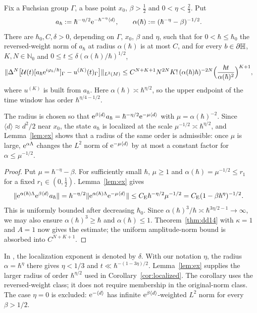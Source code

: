 \begin{corollary}\label{cor:localized}
Fix a Fuchsian group $\Gamma$, a base point $x_0$, $\beta>\tfrac12$ and $0<\eta<\tfrac23$. Put
\[
 a_\hbar:=\hbar^{-\eta/2}\mathrm{e}^{-\hbar^{-\eta}\langle d\rangle},\qquad
 \alpha(\hbar):=(\hbar^{-\eta}-\beta)^{-1/2}.
\]
There are $\hbar_0,C,\delta>0$, depending on $\Gamma$, $x_0$, $\beta$ and $\eta$, such that for $0<\hbar\le\hbar_0$ the reversed-weight
norm of $a_\hbar$ at radius $\alpha(\hbar)$ is at most $C$, and for every $b\in\partial\mathbb{H}$, $K,N\in\mathbb N_0$ and
$0\le t\le\delta(\alpha(\hbar)/\hbar)^{1/2}$,
\[
 \lVert \Delta^N\big[\mathcal{U}(t)[a_\hbar\mathrm{e}^{i\varphi_b/\hbar}]_\Gamma-u^{(K)}(t)_\Gamma\big]\rVert_{L^2(M)}
 \le C^{N+K+1}N^{2N}K!\,(\alpha(\hbar)\hbar)^{-2N}
 \Big(\frac{\hbar t}{\alpha(\hbar)^2}\Big)^{K+1},
\]
where $u^{(K)}$ is built from $a_\hbar$.
Here $\alpha(\hbar)\asymp\hbar^{\eta/2}$, so the upper endpoint of the time window has order
$\hbar^{\eta/4-1/2}$.
\end{corollary}
The radius is chosen so that $\mathrm{e}^{\beta\langle d\rangle}a_\hbar=\hbar^{-\eta/2}\mathrm{e}^{-\mu\langle d\rangle}$ with $\mu=\alpha(\hbar)^{-2}$. Since
$\langle d\rangle\approx d^2/2$ near $x_0$, the state $a_\hbar$ is localized at the scale $\mu^{-1/2}\asymp\hbar^{\eta/2}$, and Lemma~\ref{lem:ex} shows
that a radius of the same order is admissible: once $\mu$ is large, $\mathrm{e}^{\alpha\Lambda}$ changes the $L^2$ norm of $\mathrm{e}^{-\mu\langle d\rangle}$ by at most a
constant factor for $\alpha\le\mu^{-1/2}$.
\begin{proof}
Put $\mu=\hbar^{-\eta}-\beta$. For sufficiently small $\hbar$, $\mu\ge1$ and
$\alpha(\hbar)=\mu^{-1/2}\le r_1$ for a fixed $r_1\in(0,\tfrac12)$. Lemma~\ref{lem:ex} gives
\[
 \lVert \mathrm{e}^{\alpha(\hbar)\Lambda}\mathrm{e}^{\beta\langle d\rangle}a_\hbar\rVert
 =\hbar^{-\eta/2}\lVert \mathrm{e}^{\alpha(\hbar)\Lambda}\mathrm{e}^{-\mu\langle d\rangle}\rVert
 \le C_{\mathrm E}\hbar^{-\eta/2}\mu^{-1/2}
 =C_{\mathrm E}(1-\beta\hbar^\eta)^{-1/2}.
\]
This is uniformly bounded after decreasing $\hbar_0$. Since
$\alpha(\hbar)^3/\hbar\asymp\hbar^{3\eta/2-1}\to\infty$, we may also ensure
$\alpha(\hbar)^3\ge\hbar$ and $\alpha(\hbar)\le1$. Theorem~\ref{thm:dd14} with $\kappa=1$ and $A=1$ now gives the estimate;
the uniform amplitude-norm bound is absorbed into $C^{N+K+1}$.
\end{proof}

\begin{remark}
In \cite[Remark~1.7, (1.38)]{S}, the localization exponent is denoted by $\delta$.
With our notation $\eta$, the radius $\alpha=\hbar^\eta$ there gives $\eta<1/3$ and
$t\ll\hbar^{-(1-3\eta)/2}$. Lemma~\ref{lem:ex} supplies the larger radius of order
$\hbar^{\eta/2}$ used in Corollary~\ref{cor:localized}.
The corollary uses the reversed-weight class; it does not require membership in the original-norm class.
The case $\eta=0$ is excluded: $\mathrm{e}^{-\langle d\rangle}$ has infinite
$\mathrm{e}^{\beta\langle d\rangle}$-weighted $L^2$ norm for every $\beta>1/2$.
\end{remark}
